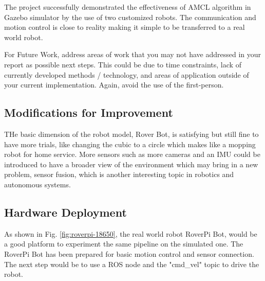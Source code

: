 \documentclass[10pt,journal,compsoc]{IEEEtran}
\begin{document}
The project successfully demonstrated the effectiveness of AMCL algorithm in Gazebo simulator by the use of two customized robots. The communication and motion control is close to reality making it simple to be transferred to a real world robot.

For Future Work, address areas of work that you may not have addressed in your report as possible next steps. This could be due to time constraints, lack of currently developed methods / technology, and areas of application outside of your current implementation. Again, avoid the use of the first-person.

\subsection{Modifications for Improvement}

THe basic dimension of the robot model, Rover Bot, is satisfying but still fine to have more trials, like changing the cubic to a circle which makes like a mopping robot for home service. More sensors such as more cameras and an IMU could be introduced to have a broader view of the environment which may bring in a new problem, sensor fusion, which is another interesting topic in robotics and autonomous systems.

\subsection{Hardware Deployment}

As shown in Fig. \ref{fig:roverpi-18650}, the real world robot RoverPi Bot, would be a good platform to experiment the same pipeline on the simulated one. The RoverPi Bot has been prepared for basic motion control and sensor connection. The next step would be to use a ROS node and the "cmd\_vel" topic to drive the robot.



\end{document}
